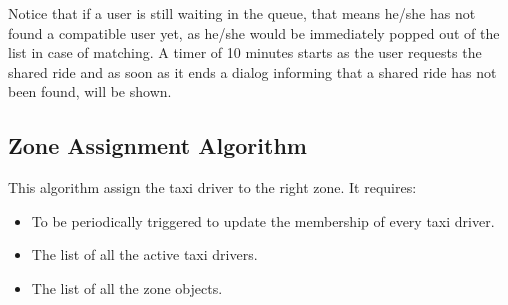 Notice that if a user is still waiting in the queue, that means he/she has not found a compatible user yet, as he/she would be immediately popped out of the list in case of matching.
A timer of 10 minutes starts as the user requests the shared ride and as soon as it ends a dialog informing that a shared ride has not been found, will be shown.





\subsection{Zone Assignment Algorithm} %
\label{sub:third_algorithm}
This algorithm assign the taxi driver to the right zone.
It requires:
\begin{itemize}
	\item To be periodically triggered to update the membership of every taxi driver.
	\item The list of all the active taxi drivers.
	\item The list of all the zone objects.
\end{itemize}







